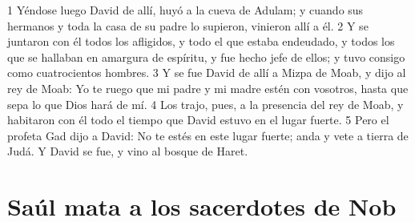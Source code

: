 1 Yéndose luego David de allí, huyó a la cueva de Adulam; y cuando sus hermanos y toda la casa de su padre lo supieron, vinieron allí a él.
2 Y se juntaron con él todos los afligidos, y todo el que estaba endeudado, y todos los que se hallaban en amargura de espíritu, y fue hecho jefe de ellos; y tuvo consigo como cuatrocientos hombres.
3 Y se fue David de allí a Mizpa de Moab, y dijo al rey de Moab: Yo te ruego que mi padre y mi madre estén con vosotros, hasta que sepa lo que Dios hará de mí.
4 Los trajo, pues, a la presencia del rey de Moab, y habitaron con él todo el tiempo que David estuvo en el lugar fuerte.
5 Pero el profeta Gad dijo a David: No te estés en este lugar fuerte; anda y vete a tierra de Judá. Y David se fue, y vino al bosque de Haret.
\section*{Saúl mata a los sacerdotes de Nob}

